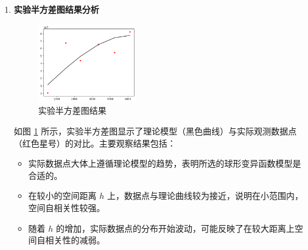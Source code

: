 \documentclass[12pt,a4paper]{nmmcm}
\begin{document}
\begin{enumerate}
  \item \textbf{实验半方差图结果分析} \\
        \begin{figure}[h]
          \centering
          \includegraphics[width=0.4\textwidth]{figures/task4/task4-1.png}
          \caption{实验半方差图结果}
          \label{fig:KrigingSemivariogram}
        \end{figure}
        如图 \ref{fig:KrigingSemivariogram} 所示，实验半方差图显示了理论模型（黑色曲线）与实际观测数据点（红色星号）的对比。主要观察结果包括：
        \begin{itemize}
          \item 实际数据点大体上遵循理论模型的趋势，表明所选的球形变异函数模型是合适的。
          \item 在较小的空间距离 \( h \) 上，数据点与理论曲线较为接近，说明在小范围内，空间自相关性较强。
          \item 随着 \( h \) 的增加，实际数据点的分布开始波动，可能反映了在较大距离上空间自相关性的减弱。
        \end{itemize}


\end{enumerate}
\end{document}
